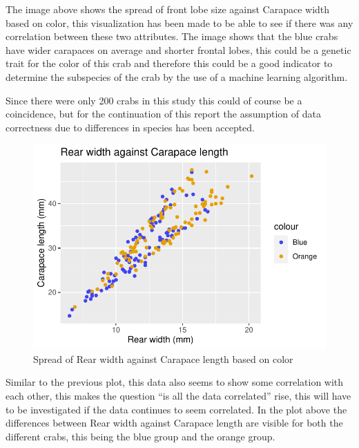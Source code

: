 \documentclass[
]{article}
\begin{document}
The image above shows the spread of front lobe size against Carapace
width based on color, this visualization has been made to be able to see
if there was any correlation between these two attributes. The image
shows that the blue crabs have wider carapaces on average and shorter
frontal lobes, this could be a genetic trait for the color of this crab
and therefore this could be a good indicator to determine the subspecies
of the crab by the use of a machine learning algorithm.

Since there were only 200 crabs in this study this could of course be a
coincidence, but for the continuation of this report the assumption of
data correctness due to differences in species has been accepted.

\begin{figure}[H]

{\centering \includegraphics{CrabProject_files/figure-latex/figure2-1} 

}

\caption{Spread of Rear width against Carapace length based on color}\label{fig:figure2}
\end{figure}

Similar to the previous plot, this data also seems to show some
correlation with each other, this makes the question ``is all the data
correlated'' rise, this will have to be investigated if the data
continues to seem correlated. In the plot above the differences between
Rear width against Carapace length are visible for both the different
crabs, this being the blue group and the orange group.
\end{document}
